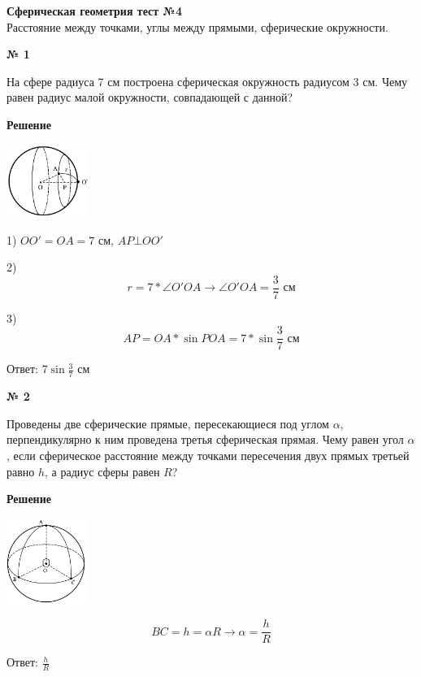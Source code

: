 


    \begin{center}
        \textbf{Сферическая геометрия тест №4}\\
        Расстояние между точками, углы между прямыми, сферические окружности.
    \end{center}

    \begin{center}
        \textbf{№ 1}
    \end{center}

    На сфере радиуса 7 см построена сферическая окружность радиусом 3 см.
    Чему равен радиус малой окружности, совпадающей с данной?

    \textbf{Решение}\\

    \begin{center}
        \includegraphics[width=0.2\textwidth]{images/img1}\\
    \end{center}

    1) $OO' = OA = 7$ см, $AP \bot OO'$

    2)
    \[
        r = 7*\angle O'OA \rightarrow \angle O'OA = \frac{3}{7} \text{ см}
    \]

    3)
    \[
        AP = OA * \sin POA = 7 * \sin \frac{3}{7} \text{ см}
    \]

    Ответ: $7\sin \frac{3}{7}$ см

    \begin{center}
        \textbf{№ 2}
    \end{center}

    Проведены две сферические прямые, пересекающиеся под углом $\alpha$,
    перпендикулярно к ним проведена третья сферическая прямая.
    Чему равен угол $\alpha$, если сферическое расстояние между точками пересечения
    двух прямых третьей равно $h$, а радиус сферы равен $R$?

    \textbf{Решение}\\

    \begin{center}
        \includegraphics[width=0.2\textwidth]{images/img2}\\
    \end{center}

    \[
        BC = h = \alpha R \rightarrow \alpha = \frac{h}{R}
    \]

    Ответ: $\frac{h}{R}$


